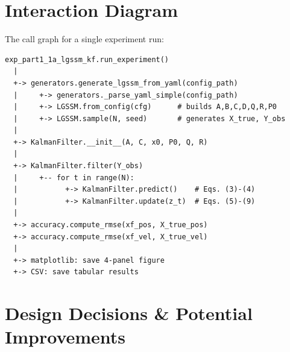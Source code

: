 \documentclass[11pt,a4paper]{article}
\begin{document}
\section{Interaction Diagram}

The call graph for a single experiment run:

\begin{verbatim}
exp_part1_1a_lgssm_kf.run_experiment()
  |
  +-> generators.generate_lgssm_from_yaml(config_path)
  |     +-> generators._parse_yaml_simple(config_path)
  |     +-> LGSSM.from_config(cfg)      # builds A,B,C,D,Q,R,P0
  |     +-> LGSSM.sample(N, seed)       # generates X_true, Y_obs
  |
  +-> KalmanFilter.__init__(A, C, x0, P0, Q, R)
  |
  +-> KalmanFilter.filter(Y_obs)
  |     +-- for t in range(N):
  |           +-> KalmanFilter.predict()    # Eqs. (3)-(4)
  |           +-> KalmanFilter.update(z_t)  # Eqs. (5)-(9)
  |
  +-> accuracy.compute_rmse(xf_pos, X_true_pos)
  +-> accuracy.compute_rmse(xf_vel, X_true_vel)
  |
  +-> matplotlib: save 4-panel figure
  +-> CSV: save tabular results
\end{verbatim}


\section{Design Decisions \& Potential Improvements}
\end{document}
